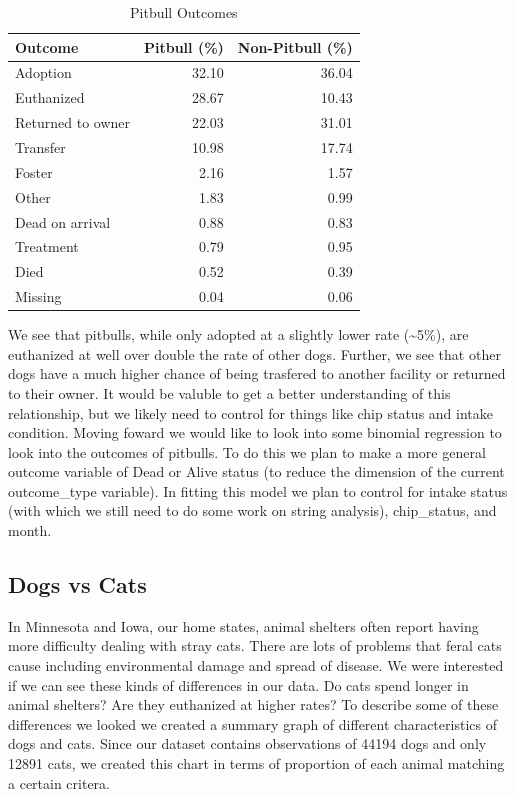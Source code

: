 \documentclass[]{article}
\begin{document}
\begin{table}[!h]

\caption{\label{tab:pitbull table}Pitbull Outcomes}
\centering
\begin{tabular}{lrr}
\toprule
Outcome & Pitbull (\%) & Non-Pitbull (\%)\\
\midrule
\rowcolor{gray!6}  Adoption & 32.10 & 36.04\\
Euthanized & 28.67 & 10.43\\
\rowcolor{gray!6}  Returned to owner & 22.03 & 31.01\\
Transfer & 10.98 & 17.74\\
\rowcolor{gray!6}  Foster & 2.16 & 1.57\\
\addlinespace
Other & 1.83 & 0.99\\
\rowcolor{gray!6}  Dead on arrival & 0.88 & 0.83\\
Treatment & 0.79 & 0.95\\
\rowcolor{gray!6}  Died & 0.52 & 0.39\\
Missing & 0.04 & 0.06\\
\bottomrule
\end{tabular}
\end{table}

We see that pitbulls, while only adopted at a slightly lower rate
(\textasciitilde{}5\%), are euthanized at well over double the rate of
other dogs. Further, we see that other dogs have a much higher chance of
being trasfered to another facility or returned to their owner. It would
be valuble to get a better understanding of this relationship, but we
likely need to control for things like chip status and intake condition.
Moving foward we would like to look into some binomial regression to
look into the outcomes of pitbulls. To do this we plan to make a more
general outcome variable of Dead or Alive status (to reduce the
dimension of the current outcome\_type variable). In fitting this model
we plan to control for intake status (with which we still need to do
some work on string analysis), chip\_status, and month.

\subsection{Dogs vs Cats}\label{dogs-vs-cats}

In Minnesota and Iowa, our home states, animal shelters often report
having more difficulty dealing with stray cats. There are lots of
problems that feral cats cause including environmental damage and spread
of disease. We were interested if we can see these kinds of differences
in our data. Do cats spend longer in animal shelters? Are they
euthanized at higher rates? To describe some of these differences we
looked we created a summary graph of different characteristics of dogs
and cats. Since our dataset contains observations of 44194 dogs and only
12891 cats, we created this chart in terms of proportion of each animal
matching a certain critera.
\end{document}
